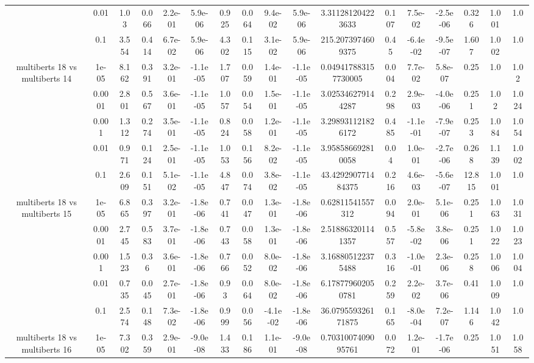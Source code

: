 \begin{tabular}{|c|c|c|c|c|c|c|c|c|c|c|c|c|c|c|c|c|}
 & 0.01 & 1.03 & 0.066 & 2.2e-01 & 5.9e-06 & 0.925 & 0.064 & 9.4e-02 & 5.9e-06 & 3.311281204223633 & 0.107 & 7.5e-02 & -2.5e-06 & 0.326 & 1.001 & 1.0 \\
 & 0.1 & 3.554 & 0.414 & 6.7e-02 & 5.9e-06 & 4.302 & 0.115 & 3.1e-02 & 5.9e-06 & 215.2073974609375 & 0.45 & -6.4e-02 & -9.5e-07 & 1.607 & 1.002 & 1.0 \\
\hline
\multirow{5}{*}{multiberts 18 vs multiberts 14} & 1e-05 & 8.162 & 0.391 & 3.2e-01 & -1.1e-05 & 1.707 & 0.059 & 1.4e-01 & -1.1e-05 & 0.049417883157730005 & 0.004 & 7.7e-02 & 5.8e-07 & 0.25 & 1.0 & 1.02 \\
 & 0.0001 & 2.801 & 0.567 & 3.6e-01 & -1.1e-05 & 1.057 & 0.054 & 1.5e-01 & -1.1e-05 & 3.025346279144287 & 0.298 & 2.9e-03 & -4.0e-06 & 0.251 & 1.02 & 1.024 \\
 & 0.001 & 1.312 & 0.274 & 3.5e-01 & -1.1e-05 & 0.824 & 0.058 & 1.2e-01 & -1.1e-05 & 3.298931121826172 & 0.485 & -1.1e-01 & -7.9e-07 & 0.253 & 1.084 & 1.054 \\
 & 0.01 & 0.971 & 0.124 & 2.5e-01 & -1.1e-05 & 1.053 & 0.156 & 8.2e-02 & -1.1e-05 & 3.958586692810058 & 0.04 & 1.0e-01 & -2.7e-06 & 0.268 & 1.139 & 1.002 \\
 & 0.1 & 2.609 & 0.151 & 5.1e-02 & -1.1e-05 & 4.847 & 0.074 & 3.8e-02 & -1.1e-05 & 43.429290771484375 & 0.216 & 4.6e-03 & -5.6e-07 & 12.815 & 1.001 & 1.0 \\
\hline
\multirow{5}{*}{multiberts 18 vs multiberts 15} & 1e-05 & 6.865 & 0.397 & 3.2e-01 & -1.8e-06 & 0.741 & 0.047 & 1.3e-01 & -1.8e-06 & 0.62811541557312 & 0.094 & 2.0e-01 & 5.1e-06 & 0.251 & 1.063 & 1.031 \\
 & 0.0001 & 2.745 & 0.583 & 3.7e-01 & -1.8e-06 & 0.743 & 0.058 & 1.3e-01 & -1.8e-06 & 2.518863201141357 & 0.557 & -5.8e-02 & 3.8e-06 & 0.251 & 1.022 & 1.023 \\
 & 0.001 & 1.523 & 0.36 & 3.6e-01 & -1.8e-06 & 0.766 & 0.052 & 8.0e-02 & -1.8e-06 & 3.168805122375488 & 0.316 & -1.0e-01 & 2.3e-06 & 0.258 & 1.006 & 1.004 \\
 & 0.01 & 0.735 & 0.045 & 2.7e-01 & -1.8e-06 & 0.93 & 0.064 & 8.0e-02 & -1.8e-06 & 6.178779602050781 & 0.259 & 2.2e-02 & 3.7e-06 & 0.41 & 1.009 & 1.0 \\
 & 0.1 & 2.574 & 0.148 & 7.3e-02 & -1.8e-06 & 0.999 & 0.056 & -4.1e-02 & -1.8e-06 & 36.079559326171875 & 0.165 & -8.0e-04 & 7.2e-07 & 1.146 & 1.042 & 1.0 \\
\hline
\multirow{5}{*}{multiberts 18 vs multiberts 16} & 1e-05 & 7.302 & 0.359 & 2.9e-01 & -9.0e-08 & 1.433 & 0.186 & 1.1e-01 & -9.0e-08 & 0.7031007409095761 & 0.072 & 1.2e-01 & -1.7e-06 & 0.25 & 1.051 & 1.058 \\

\end{tabular}
